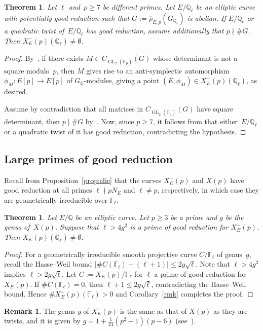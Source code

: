 \documentclass[12pt]{amsart}
\numberwithin{equation}{section}
\newtheorem{theorem}[equation]{Theorem}
\theoremstyle{definition}
\newtheorem{remark}[equation]{Remark}
\newcommand{\F}{\mathbb{F}}
\newcommand{\Q}{\mathbb{Q}}
\newcommand{\rhobar}{{\overline{\rho}}}
\newcommand{\Xp}{X_E^{-}(p)}
\DeclareMathOperator{\GL}{GL}
\begin{document}
\begin{theorem}
\label{thm:abelian}
Let $\ell$ and~$p \geq 7$ be different primes. Let $E/\Q_\ell$ be an elliptic curve with potentially good reduction 
such that $G:=\rhobar_{E,p}(G_{\Q_\ell})$ is abelian. If $E/\Q_\ell$ or a quadratic twist of~$E/\Q_\ell$ has good reduction, assume additionally that
$p \nmid \# G$.
Then $\Xp(\Q_\ell) \neq \emptyset$.
\end{theorem}
\begin{proof}
By~\cite[Lemma~6]{symplectic}, if there exists $M \in C_{\GL_2(\F_p)}(G)$ whose determinant is not a square modulo~$p$, then $M$ gives rise to an anti-symplectic automorphism $\phi_M: E[p] \to E[p]$ of $G_\Q$-modules,
giving a point $(E,\phi_M) \in X_E^{-}(p)(\Q_\ell)$, as desired.

Assume by contradiction that all matrices in $C_{\GL_2(\F_p)}(G)$ have square determinant, then $p \mid \#G$ by~\cite[Lemma~8]{symplectic}.
Now, since $p \geq 7$, it follows from \cite[Proposition 3]{symplectic} that either~$E/\Q_\ell$ or a quadratic twist of it has good reduction, contradicting the hypothesis.
\end{proof}

\subsection{Large primes of good reduction}
Recall from Proposition~\ref{prop:elie} that 
the curves $X_E^-(p)$ and $X(p)$ have good reduction at 
all primes $\ell \nmid p N_E$ and $\ell \neq p$, respectively, in which case they are geometrically irreducible over $\F_\ell$.

\begin{theorem}\label{thm:Hensel} Let $E/\Q$ be an elliptic curve.
    Let $p\geq 3$ be a prime and $g$ be the genus of~$X(p)$.
    Suppose that $\ell>4g^2$ is a prime of good reduction for $X_E^{-}(p)$.
    Then $X_E^{-}(p)(\Q_\ell)\neq \emptyset$.
\end{theorem}
\begin{proof} For a geometrically irreducible smooth projective curve $C / \F_\ell$ of genus~$g$, recall the Hasse--Weil bound $|\#C(\F_\ell) - (\ell+1) | \leq 2g \sqrt{\ell}$.
Note that $\ell > 4g^2$ implies $\ell > 2g\sqrt{\ell}$. Let $C := X_E^{-}(p) / \F_\ell$ for $\ell$ a prime of good reduction for $X_E^{-}(p)$. 
If $\# C(\F_\ell) = 0$, then $\ell + 1 \leq 2g\sqrt{\ell}$, contradicting the Hasse--Weil bound.
Hence $\# X_E^{-}(p)(\F_\ell) > 0$ and Corollary~\ref{rmk} completes the proof.
\end{proof}
\begin{remark}\label{rmk:genus}
    The genus $g$ of $X_E^{-}(p)$ is the same as that of $X(p)$ as they are twists, and it is given by $g=1+\frac{1}{24}(p^2-1)(p-6)$ (see~\cite[p. 77]{Halberstadt}).
\end{remark}
\vspace{-2mm}
\end{document}
